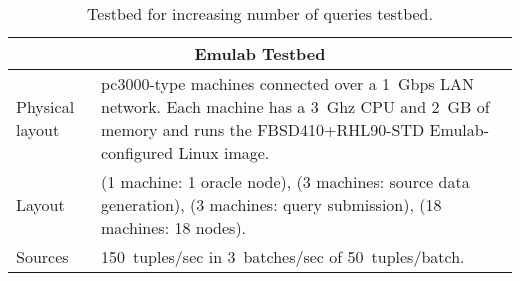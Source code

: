 \begin{table}[h]
  \centering
  \renewcommand{\arraystretch}{1.5}
  \begin{tabular}{|m{3cm}|p{12cm}|} 
  \hline
 
    \multicolumn{2}{|c|}{\bf Emulab Testbed} \\ 
    \hline\hline
	Physical layout  &	
	pc3000-type machines connected over a 1~Gbps LAN network. Each machine has a 3~Ghz
	CPU and 2~GB of memory and runs the FBSD410+RHL90-STD Emulab-configured Linux image.
	\\
    \hline
	\sys Layout
	&
	(1 machine: 1 oracle node),   
	(3 machines: source data generation), 
	(3 machines: query submission),
	(18 machines: 18 \sys nodes). \\
    \hline
	
	Sources
	& 
	150~tuples/sec in 3~batches/sec of 50~tuples/batch. \\
	
    \hline\hline
    
    
  \end{tabular}
  \caption{Testbed for increasing number of queries testbed.}
  \label{table:inc-testbed}
\end{table}
